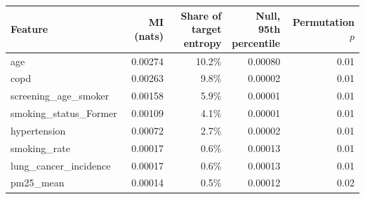 \begin{tabular}{lrrrr}
\toprule
Feature & MI (nats) & \makecell[b]{Share of target\\{}entropy} & \makecell[b]{Null, 95th\\{}percentile} & \makecell[b]{Permutation\\{}$p$} \\
\midrule
age & 0.00274 & 10.2\% & 0.00080 & 0.01 \\
copd & 0.00263 & 9.8\% & 0.00002 & 0.01 \\
screening\_age\_smoker & 0.00158 & 5.9\% & 0.00001 & 0.01 \\
smoking\_status\_Former & 0.00109 & 4.1\% & 0.00001 & 0.01 \\
hypertension & 0.00072 & 2.7\% & 0.00002 & 0.01 \\
smoking\_rate & 0.00017 & 0.6\% & 0.00013 & 0.01 \\
lung\_cancer\_incidence & 0.00017 & 0.6\% & 0.00013 & 0.01 \\
pm25\_mean & 0.00014 & 0.5\% & 0.00012 & 0.02 \\
\bottomrule
\end{tabular}

